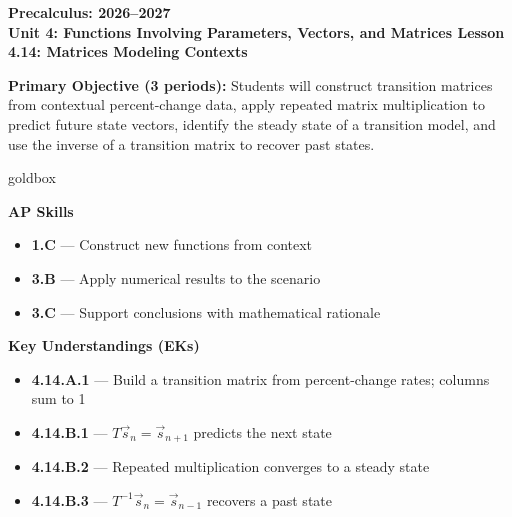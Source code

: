 \documentclass[10pt]{article}
\newcommand{\CourseName}{Precalculus}
\newcommand{\SchoolYear}{2026--2027}
\newcommand{\UnitNumberName}{Unit 4: Functions Involving Parameters, Vectors, and Matrices \quad}
\newcommand{\LessonNumberName}{Lesson 4.14: Matrices Modeling Contexts}
\begin{document}
\begin{center}
    {\Large\bfseries \CourseName: \SchoolYear \\[4pt]
    {\small\bfseries \UnitNumberName \LessonNumberName}}
\end{center}

\begin{tcolorbox}[colback=sky, colframe=navy, boxrule=0.9pt, arc=2mm,
    left=2mm, right=2mm, top=1.5mm, bottom=1.5mm]
    \textbf{Primary Objective (3 periods):} Students will construct transition matrices from contextual percent-change data, apply repeated matrix multiplication to predict future state vectors, identify the steady state of a transition model, and use the inverse of a transition matrix to recover past states.
\end{tcolorbox}

\renewcommand{\arraystretch}{1.6}
\begin{skillbox}{goldbox}
\begin{minipage}[t]{0.48\linewidth}\vspace{0pt}
\textbf{AP Skills}
\begin{itemize}[leftmargin=1.4em, itemsep=1pt]
  \item \textbf{1.C} --- Construct new functions from context
  \item \textbf{3.B} --- Apply numerical results to the scenario
  \item \textbf{3.C} --- Support conclusions with mathematical rationale
\end{itemize}
\end{minipage}
\hfill
\begin{minipage}[t]{0.48\linewidth}\vspace{0pt}
\textbf{Key Understandings (EKs)}
\begin{itemize}[leftmargin=1.4em, itemsep=1pt]
  \item \textbf{4.14.A.1} --- Build a transition matrix from percent-change rates; columns sum to 1
  \item \textbf{4.14.B.1} --- $T\vec{s}_n = \vec{s}_{n+1}$ predicts the next state
  \item \textbf{4.14.B.2} --- Repeated multiplication converges to a steady state
  \item \textbf{4.14.B.3} --- $T^{-1}\vec{s}_n = \vec{s}_{n-1}$ recovers a past state
\end{itemize}
\end{minipage}
\end{skillbox}
\end{document}
